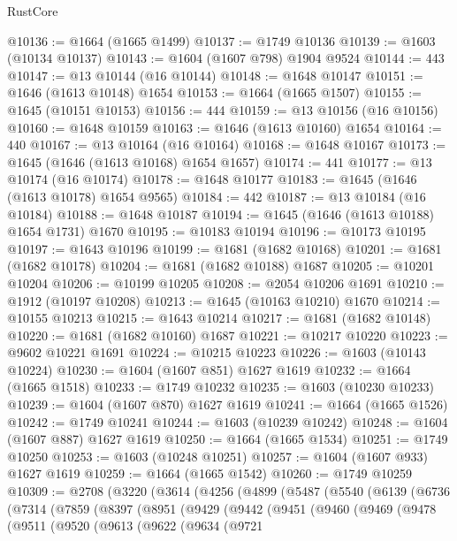 \begin{lexlean}{RustCore}
\begin{coremodule}
@10136 := @1664 (@1665 @1499)
@10137 := @1749 @10136
@10139 := @1603 (@10134 @10137)
@10143 := @1604 (@1607 @798) @1904 @9524
@10144 := 443
@10147 := @13 @10144 (@16 @10144)
@10148 := @1648 @10147
@10151 := @1646 (@1613 @10148) @1654
@10153 := @1664 (@1665 @1507)
@10155 := @1645 (@10151 @10153)
@10156 := 444
@10159 := @13 @10156 (@16 @10156)
@10160 := @1648 @10159
@10163 := @1646 (@1613 @10160) @1654
@10164 := 440
@10167 := @13 @10164 (@16 @10164)
@10168 := @1648 @10167
@10173 := @1645 (@1646 (@1613 @10168) @1654 @1657)
@10174 := 441
@10177 := @13 @10174 (@16 @10174)
@10178 := @1648 @10177
@10183 := @1645 (@1646 (@1613 @10178) @1654 @9565)
@10184 := 442
@10187 := @13 @10184 (@16 @10184)
@10188 := @1648 @10187
@10194 := @1645 (@1646 (@1613 @10188) @1654 @1731) @1670
@10195 := @10183 @10194
@10196 := @10173 @10195
@10197 := @1643 @10196
@10199 := @1681 (@1682 @10168)
@10201 := @1681 (@1682 @10178)
@10204 := @1681 (@1682 @10188) @1687
@10205 := @10201 @10204
@10206 := @10199 @10205
@10208 := @2054 @10206 @1691
@10210 := @1912 (@10197 @10208)
@10213 := @1645 (@10163 @10210) @1670
@10214 := @10155 @10213
@10215 := @1643 @10214
@10217 := @1681 (@1682 @10148)
@10220 := @1681 (@1682 @10160) @1687
@10221 := @10217 @10220
@10223 := @9602 @10221 @1691
@10224 := @10215 @10223
@10226 := @1603 (@10143 @10224)
@10230 := @1604 (@1607 @851) @1627 @1619
@10232 := @1664 (@1665 @1518)
@10233 := @1749 @10232
@10235 := @1603 (@10230 @10233)
@10239 := @1604 (@1607 @870) @1627 @1619
@10241 := @1664 (@1665 @1526)
@10242 := @1749 @10241
@10244 := @1603 (@10239 @10242)
@10248 := @1604 (@1607 @887) @1627 @1619
@10250 := @1664 (@1665 @1534)
@10251 := @1749 @10250
@10253 := @1603 (@10248 @10251)
@10257 := @1604 (@1607 @933) @1627 @1619
@10259 := @1664 (@1665 @1542)
@10260 := @1749 @10259
@10309 := @2708
    (@3220
      (@3614
        (@4256
          (@4899
            (@5487
              (@5540
                (@6139
                  (@6736
                    (@7314
                      (@7859
                        (@8397
                          (@8951
                            (@9429
                              (@9442
                                (@9451
                                  (@9460
                                    (@9469
                                      (@9478
                                        (@9511
                                          (@9520
                                            (@9613
                                              (@9622
                                                (@9634
                                                  (@9721

\end{coremodule}
\end{lexlean}
